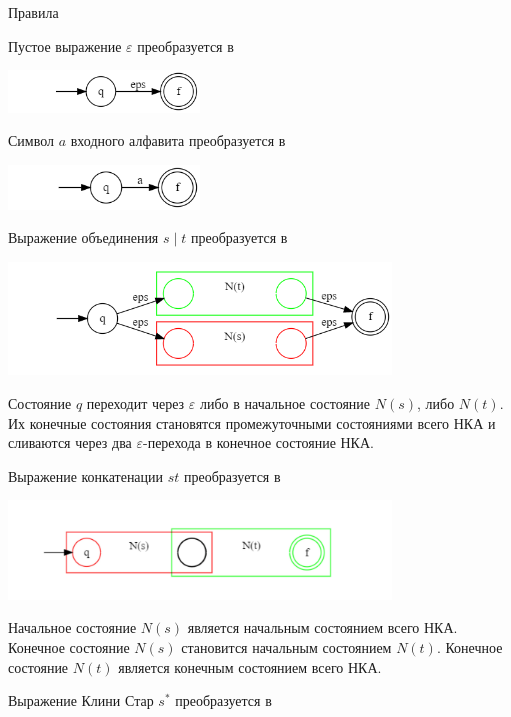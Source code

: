 \documentclass[mathserif]{beamer}
\def\alter{\ensuremath{\mathrel{\vert}}}%
\def\star{\ensuremath{^{*}}}%
\newcommand{\empt}{\varepsilon} %
\begin{document}
\begin{frame}{Правила}  {\vspace{-5pt}}
    \vspace{-5pt}
     {
        Пустое выражение $\empt$ преобразуется в

        \includegraphics[width=2in, keepaspectratio]{tompson_rule1.png} %

        Символ $a$ входного алфавита преобразуется в

        \includegraphics[width=2in, keepaspectratio]{tompson_rule2.png} %
    }
     {
        Выражение объединения $s\alter t$ преобразуется в

        \includegraphics[width=4in, keepaspectratio]{tompson_rule3.png} %

        Состояние $q$ переходит через $\empt$ либо в начальное состояние $N(s)$, либо $N(t)$. Их конечные состояния становятся промежуточными состояниями всего НКА и сливаются через два $\empt$-перехода в конечное состояние НКА.
    }
     {
        Выражение конкатенации $st$ преобразуется в

        \includegraphics[width=4in, keepaspectratio]{tompson_rule4.png} %

        Начальное состояние $N(s)$ является начальным состоянием всего НКА. Конечное состояние $N(s)$ становится начальным состоянием $N(t)$. Конечное состояние $N(t)$ является конечным состоянием всего НКА.
    }
     {
        Выражение Клини Стар $s\star$ преобразуется в

}
\end{frame}
\end{document}
